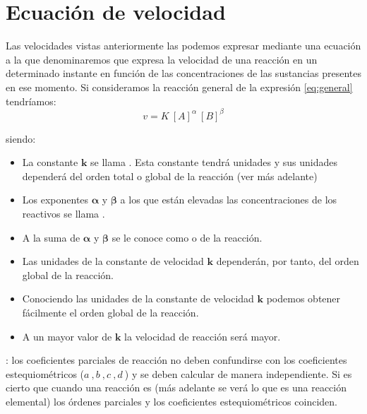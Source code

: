     \section{Ecuación de velocidad}\label{sec:ecuacion-de-velocidad}

    Las velocidades vistas anteriormente las podemos expresar mediante una ecuación a la que denominaremos  que expresa la velocidad de una reacción en un determinado instante en función de las concentraciones de las sustancias presentes en ese momento.
    Si consideramos la reacción general de la expresión \eqref{eq:general} tendríamos:
    \begin{equation}
        v = K\ [A]^\alpha\ [B]^\beta\label{eq:ecuacion-velocidad-general}
    \end{equation}

    \vspace*{-6pt}
    siendo:
    \begin{itemize}
        \item La constante $\bm{k}$ se llama .
        Esta constante tendrá unidades y sus unidades dependerá del orden total o global de la reacción (ver más adelante)
        \item Los exponentes $\bm{\alpha}$ y $\bm{\beta}$ a los que están elevadas las concentraciones de los reactivos se llama .
        \item A la suma de $\bm{\alpha}$ y $\bm{\beta}$ se le conoce como  o   de la reacción.
        \item Las unidades de la constante de velocidad $\bm{k}$ dependerán, por tanto, del orden global de la reacción.
        \item Conociendo las unidades de la constante de velocidad \( \bm{k} \) podemos obtener fácilmente el orden global de la reacción.
        \item A un mayor valor de $\bm{k}$ la velocidad de reacción será mayor.
    \end{itemize}

    : los coeficientes parciales de reacción no deben confundirse con los coeficientes estequiométricos ($a\ , b\ , c\ , d\ $) y se deben calcular de manera independiente.
    Si es cierto que cuando una reacción es  (más adelante se verá lo que es una reacción elemental) los órdenes parciales y los coeficientes estequiométricos coinciden.

